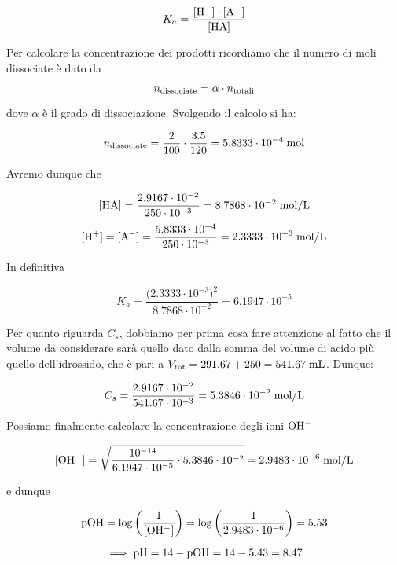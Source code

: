 $$K_a=\rm \frac{[H^+] \cdot [A^-]}{[HA]}$$

Per calcolare la concentrazione dei prodotti ricordiamo che il numero di moli dissociate è dato da

$$n_{\rm dissociate}=\alpha \cdot n_{\rm totali}$$

dove $\alpha$ è il grado di dissociazione. Svolgendo il calcolo si ha:

$$n_{\rm dissociate}
=\frac{2}{100} \cdot \frac{3.5}{120}
=5.8333 \cdot 10^{-4} \; \rm mol$$

Avremo dunque che

$$\rm [HA]=\frac{2.9167 \cdot 10^{-2}}{250 \cdot 10^{-3}}=8.7868 \cdot 10^{-2} \; mol/L$$
$$\rm [H^+]=[A^-]=\frac{5.8333 \cdot 10^{-4}}{250 \cdot 10^{-3}}=2.3333 \cdot 10^{-3} \; mol/L$$

In definitiva

$$K_a=\frac{\big( 2.3333 \cdot 10^{-3} \big)^2}{8.7868 \cdot 10^{-2}}=6.1947 \cdot 10^{-5}$$

Per quanto riguarda $C_s$, dobbiamo per prima cosa fare attenzione al fatto che il volume da considerare sarà quello dato dalla somma del volume di acido più quello dell'idrossido, che è pari a $V_{\rm tot}=291.67 + 250=541.67 \; \rm mL$. Dunque:

$$C_s=\frac{2.9167 \cdot 10^{-2}}{541.67 \cdot 10^{-3}}=5.3846 \cdot 10^{-2} \; \rm mol/L$$

Possiamo finalmente calcolare la concentrazione degli ioni $\rm OH^-$

$$[\text{OH}^-]
=\sqrt{\frac{10^{-14}}{6.1947 \cdot 10^{-5}} \cdot 5.3846 \cdot 10^{-2}}
=2.9483 \cdot 10^{-6} \; \rm mol/L$$

e dunque

$$\rm pOH=\log\left(\frac{1}{[OH^-]}\right)=\log\left(\frac{1}{2.9483 \cdot 10^{-6}}\right)=5.53$$

$$\implies \rm pH=14 - pOH=14 - 5.43=8.47$$